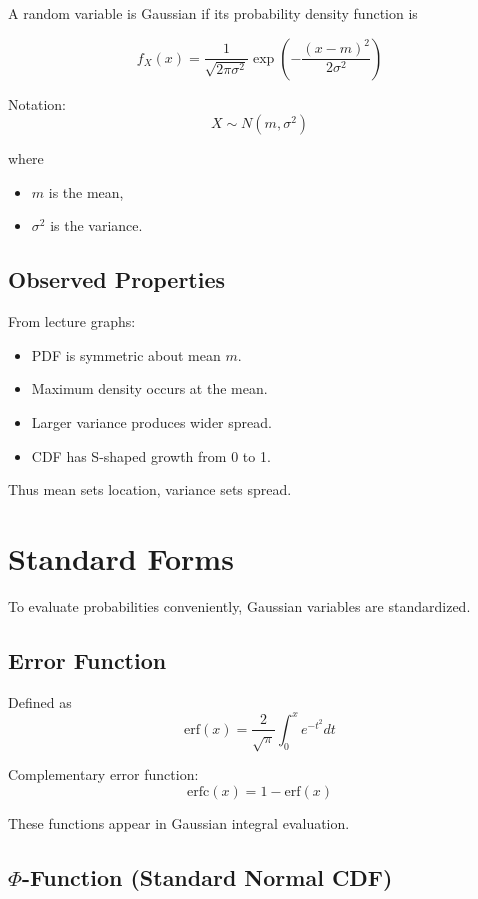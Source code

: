 \documentclass{article}
\begin{document}
A random variable is Gaussian if its probability density function is

\[
f_X(x) =
\frac{1}{\sqrt{2\pi\sigma^2}}
\exp\left(-\frac{(x-m)^2}{2\sigma^2}\right)
\]

Notation:
\[
X \sim N(m,\sigma^2)
\]

where
\begin{itemize}
    \item $m$ is the mean,
    \item $\sigma^2$ is the variance.
\end{itemize}

\subsection{Observed Properties}

From lecture graphs:

\begin{itemize}
    \item PDF is symmetric about mean $m$.
    \item Maximum density occurs at the mean.
    \item Larger variance produces wider spread.
    \item CDF has S-shaped growth from 0 to 1.
\end{itemize}

Thus mean sets location, variance sets spread.

\section{Standard Forms}

To evaluate probabilities conveniently, Gaussian variables are standardized.

\subsection{Error Function}

Defined as
\[
\text{erf}(x) = \frac{2}{\sqrt{\pi}} \int_0^x e^{-t^2} dt
\]

Complementary error function:
\[
\text{erfc}(x) = 1 - \text{erf}(x)
\]

These functions appear in Gaussian integral evaluation.

\subsection{$\Phi$-Function (Standard Normal CDF)}
\end{document}
